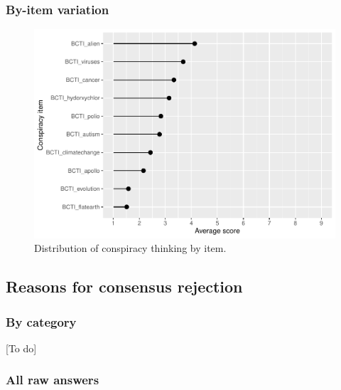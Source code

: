 \documentclass[
  doc,floatsintext]{apa6}
\begin{document}
\subsubsection{By-item variation}\label{by-item-variation-1}



\begin{figure}
\centering
\includegraphics{output/figures/exp2-conspiracy-items.pdf}
\caption{\label{fig:exp2-conspiracy-items}Distribution of conspiracy thinking by item.}
\end{figure}

\subsection{Reasons for consensus rejection}\label{reasons-for-consensus-rejection}

\subsubsection{By category}\label{by-category}

{[}To do{]}

\subsubsection{All raw answers}\label{all-raw-answers}
\end{document}

